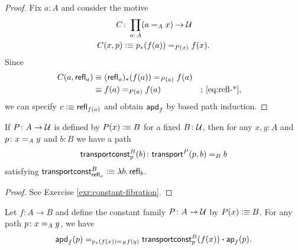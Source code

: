 \begin{proof}
    Fix $a\colon A$ and consider the motive
    \begin{align*}
        C&\colon\prod_{a\colon A}(a\eq Ax)\to\univ\\
        C(x,p)&\defeq p_*(f(a))\eq{P(x)}f(x).
    \end{align*}
    Since
    \begin{align*}
        C(a,\mathsf{refl}_a)
            &\equiv (\mathsf{refl}_a)_*(f(a))\mathrel{=_{P(a)}}f(a)\\
            &\equiv f(a)\mathrel{=_{P(a)}}f(a)
                &&\text{; \eqref{eq:refl-*}},
    \end{align*}
    we can specify $c\mathrel{\vcentcolon}\equiv\mathsf{refl}_{f(a)}$ and obtain $\mathsf{apd}_f$ by based path induction.
\end{proof}

\begin{lem}\label{lem:constant-fibration}
    If\/ $P \colon A \to \univ$ is defined by\/ $P(x) \mathrel{\vcentcolon}\equiv B$ for a fixed\/ $B \colon \univ$, then for any\/ $x, y \colon A$ and\/ $p \colon x \eq A y$ and\/ $b \colon B$ we have a path
    \[
        \fun{transportconst}^B_p(b) \colon \fun{transport}^P(p, b) \eq B b
    \]
    satisfying\/ $\mathsf{transportconst}^B_{\mathsf{refl}_x}\mathrel{\vcentcolon}\equiv\lambda b.\,\mathsf{refl}_b$.
\end{lem}

\begin{proof}
    See Exercise \ref{exr:constant-fibration}.
    
\end{proof}

\begin{lem}\label{lem:apd-constant-fibration}
    Let\/ $f\colon A\to B$ and define the constant family\/ $P\colon A\to\univ$ by\/ $P(x)\mathrel{\vcentcolon}\equiv B$. For any path\/ $p\colon x\eq Ay$, we have
    \[
        \mathsf{apd}_f(p)\mathrel{=_{p_*(f(x))\mathrel{=_{B}} f(y)}}
            \mathsf{transportconst}^B_p(f(x))\mathbin{\boldsymbol{\cdot}}\mathsf{ap}_f(p).
    \]
\end{lem}

